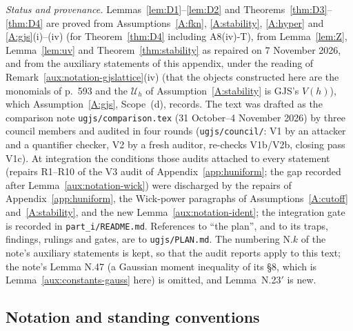 \documentclass[11pt,a4paper]{article}
\theoremstyle{plain}
\theoremstyle{definition}
\theoremstyle{plain}
\theoremstyle{definition}
\begin{document}
\emph{Status and provenance.}  Lemmas~\ref{lem:D1}--\ref{lem:D2} and
Theorems~\ref{thm:D3}--\ref{thm:D4} are proved from Assumptions~\ref{A:fkn},
\ref{A:stability}, \ref{A:hyper} and \ref{A:gjs}(i)--(iv) (for Theorem~\ref{thm:D4} including
A8(iv)-T), from Lemma~\ref{lem:Z}, Lemma~\ref{lem:uv} and Theorem~\ref{thm:stability} as
repaired on 7 November 2026, and from the auxiliary statements of this appendix, under the
reading of Remark~\ref{aux:notation-gjslattice}(iv) (that the objects constructed here are
the monomials of p.~593 and the $\mathcal U_h$ of Assumption~\ref{A:stability} is GJS's
$V(h)$), which Assumption~\ref{A:gjs}, Scope~(d), records.  The text was drafted as the
comparison note \texttt{ugjs/comparison.tex} (31 October--4 November 2026) by three council
members and audited in four rounds (\texttt{ugjs/council/}: V1 by an attacker and a
quantifier checker, V2 by a fresh auditor, re-checks V1b/V2b, closing pass V1c).  At integration the conditions those audits attached to every statement (repairs
R1--R10 of the V3 audit of Appendix~\ref{app:huniform}; the gap recorded after
Lemma~\ref{aux:notation-wick}) were discharged by the repairs of Appendix~\ref{app:huniform},
the Wick-power paragraphs of Assumptions~\ref{A:cutoff} and~\ref{A:stability}, and the new
Lemma~\ref{aux:notation-ident}; the integration gate is recorded in \texttt{part\_i/README.md}.
References to ``the plan'', and to its traps, findings, rulings and gates, are to
\texttt{ugjs/PLAN.md}.  The numbering N.$k$ of the note's auxiliary statements is kept, so that the
audit reports apply to this text; the note's Lemma N.47 (a Gaussian moment inequality of its
\S8, which is Lemma~\ref{aux:constants-gauss} here) is omitted, and Lemma~N.23$'$ is new.

\subsection{Notation and standing conventions}\label{sec:notation}
\end{document}
